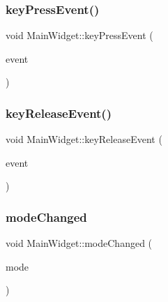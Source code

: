 \subsubsection{\texorpdfstring{key\+Press\+Event()}{keyPressEvent()}}
{\footnotesize\ttfamily void Main\+Widget\+::key\+Press\+Event (\begin{DoxyParamCaption}\item[{Q\+Key\+Event $\ast$}]{event }\end{DoxyParamCaption})\hspace{0.3cm}{\ttfamily [protected]}}

\hypertarget{class_main_widget_aeeec4a8f3b1948f7cb8a54832aae29df}{}\label{class_main_widget_aeeec4a8f3b1948f7cb8a54832aae29df} 
\subsubsection{\texorpdfstring{key\+Release\+Event()}{keyReleaseEvent()}}
{\footnotesize\ttfamily void Main\+Widget\+::key\+Release\+Event (\begin{DoxyParamCaption}\item[{Q\+Key\+Event $\ast$}]{event }\end{DoxyParamCaption})\hspace{0.3cm}{\ttfamily [protected]}}

\hypertarget{class_main_widget_a7ee933a7699c2d3f6e1f489f822640a4}{}\label{class_main_widget_a7ee933a7699c2d3f6e1f489f822640a4} 
\subsubsection{\texorpdfstring{mode\+Changed}{modeChanged}}
{\footnotesize\ttfamily void Main\+Widget\+::mode\+Changed (\begin{DoxyParamCaption}\item[{int}]{mode }\end{DoxyParamCaption})\hspace{0.3cm}{\ttfamily [signal]}}

\hypertarget{class_main_widget_adc6c0a1a15d78df19bce3d04458c27e2}{}\label{class_main_widget_adc6c0a1a15d78df19bce3d04458c27e2} 
